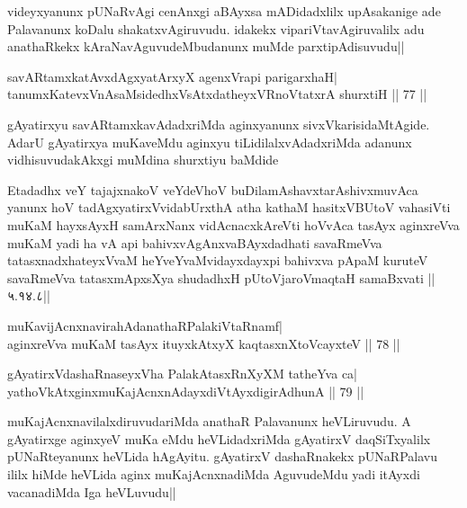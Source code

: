 \begin{artha} 
videyxyanunx pUNaRvAgi cenAnxgi aBAyxsa mADidadxlilx upAsakanige ade 
Palavanunx koDalu shakatxvAgiruvudu. idakekx vipariVtavAgiruvalilx adu 
anathaRkekx kAraNavAguvudeMbudanunx muMde parxtipAdisuvudu||
\end{artha}

\begin{shl}
savARtamxkatAvxdAgxyatArxyX agenxVrapi parigarxhaH| \\
tanumxKatevxVnAsaMsidedhxVsAtxdatheyxVRnoVtatxrA shurxtiH \hfill||  77 || 
\end{shl}

\begin{artha} 
gAyatirxyu savARtamxkavAdadxriMda aginxyanunx sivxVkarisidaMtAgide. 
AdarU gAyatirxya muKaveMdu aginxyu tiLidilalxvAdadxriMda adanunx 
vidhisuvudakAkxgi muMdina shurxtiyu baMdide\\
\begin{shl}
Etadadhx veY tajajxnakoV veYdeVhoV buDilamAshavxtarAshivxmuvAca yanunx hoV tadAgxyatirxVvidabUrxthA atha kathaM hasitxVBUtoV vahasiVti muKaM hayxsAyxH samArxNanx vidAcnacxkAreVti hoVvAca tasAyx aginxreVva muKaM yadi ha vA api bahivxvAgAnxvaBAyxdadhati savaRmeVva tatasxnadxhateyxVvaM heYveYvaMvidayxdayxpi bahivxva pApaM kuruteV savaRmeVva tatasxmApxsXya shudadhxH pUtoV\s jaroV\s maqtaH samaBxvati ||५.१४.८||
\end{shl}
\end{artha}


\begin{shl}
muKavijAcnxnavirahAdanathaRPalakiVtaRnamf| \\
aginxreVva muKaM tasAyx ituyxkAtxyX kaqtasxnXtoVcayxteV \hfill||  78 || 
\end{shl}

\begin{shl}
gAyatirxVdashaRnaseyxVha PalakAtasxRnXyXM tatheYva ca| \\
yathoVkAtxginxmuKajAcnxnAdayxdiVtAyxdigirA\s dhunA \hfill||  79 || 
\end{shl}

\begin{artha} 
muKajAcnxnavilalxdiruvudariMda anathaR Palavanunx heVLiruvudu. A 
gAyatirxge aginxyeV muKa eMdu heVLidadxriMda gAyatirxV daqSiTxyalilx 
pUNaRteyanunx heVLida hAgAyitu. gAyatirxV dashaRnakekx pUNaRPalavu 
ililx hiMde heVLida aginx muKajAcnxnadiMda AguvudeMdu yadi itAyxdi 
vacanadiMda Iga heVLuvudu||
\end{artha}

